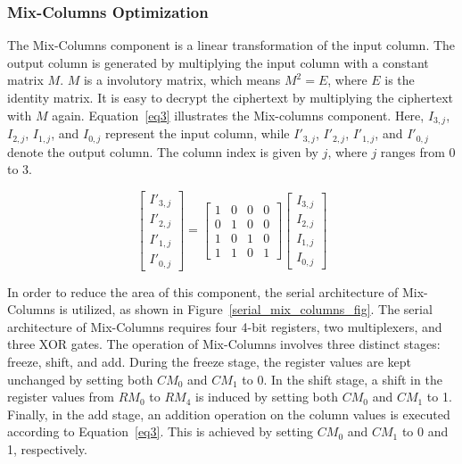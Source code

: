 \documentclass[final,5p,times,twocolumn]{elsarticle}
\begin{document}
\subsubsection{Mix-Columns Optimization}\label{subsubsec2}

The Mix-Columns component is a linear transformation of the input column.
The output column is generated by multiplying the input column with a constant matrix $M$.
$M$ is a involutory matrix, which means $M^2 = E$, where $E$ is the identity matrix.
It is easy to decrypt the ciphertext by multiplying the ciphertext with $M$ again.
Equation~\ref{eq3} illustrates the Mix-columns component.
Here, $I_{3,j}$, $I_{2,j}$, $I_{1,j}$, and $I_{0,j}$ represent the input column, while $I'_{3,j}$, $I'_{2,j}$, $I'_{1,j}$, and $I'_{0,j}$ denote the output column.
The column index is given by $j$, where $j$ ranges from 0 to 3.

\begin{equation}
    \begin{bmatrix}
        I'_{3,j} \\
        I'_{2,j} \\
        I'_{1,j} \\
        I'_{0,j}
    \end{bmatrix}
    =
    \begin{bmatrix}
        1 & 0 & 0 & 0 \\
        0 & 1 & 0 & 0 \\
        1 & 0 & 1 & 0 \\
        1 & 1 & 0 & 1
    \end{bmatrix}
    \begin{bmatrix}
        I_{3,j} \\
        I_{2,j} \\
        I_{1,j} \\
        I_{0,j}
    \end{bmatrix}
    \label{eq3}
\end{equation}


In order to reduce the area of this component, the serial architecture of Mix-Columns is utilized, as shown in Figure~\ref{serial_mix_columns_fig}.
The serial architecture of Mix-Columns requires four 4-bit registers, two multiplexers, and three XOR gates.
The operation of Mix-Columns involves three distinct stages: freeze, shift, and add.
During the freeze stage, the register values are kept unchanged by setting both $CM_0$ and $CM_1$ to 0.
In the shift stage, a shift in the register values from $RM_0$ to $RM_4$ is induced by setting both $CM_0$ and $CM_1$ to 1.
Finally, in the add stage, an addition operation on the column values is executed according to Equation~\ref{eq3}. This is achieved by setting $CM_0$ and $CM_1$ to 0 and 1, respectively.
\end{document}
